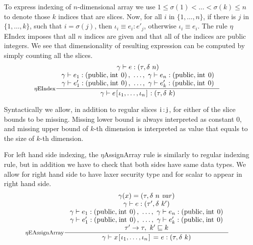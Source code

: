 \documentclass[a4paper, 10pt, draft]{report}
\newcommand{\mycode}[1]{\ensuremath{\mbox{\lstinline{#1}}}}
\begin{document}
To express indexing of $n$-dimensional array we use $1 \leq \sigma(1) < \ldots
< \sigma(k) \leq n$ to denote those $k$ indices that are slices. Now, for all
$i$ in $\{1, \ldots, n\}$, if there is $j$ in $\{1,\ldots,k\}$, such that $i =
\sigma(j)$, then $\iota_i \equiv e_i : e'_j$, otherwise $\iota_i \equiv e_i$.
The rule $\eta$EIndex imposes that all $n$ indices are given and that all of
the indices are public integers. We see that dimensionality of resulting
expression can be computed by simply counting all the slices.
\[
\inference[$\eta$EIndex]
{
  \gamma |- e : \left( \tau, \delta\ n \right) \\
  \gamma |- e_1 : \left(\mycode{public}, \mycode{int}\ 0 \right),\ \ldots,\ \gamma |- e_n : \left(\mycode{public}, \mycode{int}\ 0 \right)\\
  \gamma |- e'_1 : \left(\mycode{public}, \mycode{int}\ 0 \right),\ \ldots,\ \gamma |- e'_k : \left(\mycode{public}, \mycode{int}\ 0 \right)
} 
{
  \gamma |- e \mycode{[} \iota_1, \ldots, \iota_n \mycode{]} : \left(\tau, \delta\ k\right)
}
\]

Syntactically we allow, in addition to regular slices \mycode{i:j}, for either
of the slice bounds to be missing. Missing lower bound is always interpreted as
constant $0$, and missing upper bound of $k$-th dimension is interpreted as
value that equals to the size of $k$-th dimension.

For left hand side indexing, the $\eta$AssignArray rule is similarly to regular
indexing rule, but in addition we have to check that both sides have same data
types. We allow for right hand side to have laxer security type and for scalar
to appear in right hand side.
\[ \inference[$\eta$EAssignArray]
{
  \gamma(x) = \left( \tau, \delta\ n\ \mathit{var} \right) \\
  \gamma |- e : \left(\tau', \delta\ k'\right) \\
  \gamma |- e_1 : \left(\mycode{public}, \mycode{int}\ 0 \right),\ \ldots,\ \gamma |- e_n : \left(\mycode{public}, \mycode{int}\ 0 \right)\\
  \gamma |- e'_1 : \left(\mycode{public}, \mycode{int}\ 0 \right),\ \ldots,\ \gamma |- e'_k : \left(\mycode{public}, \mycode{int}\ 0 \right)\\
  \tau' \to \tau,\ k' \sqsubseteq k
} 
{
  \gamma |- x \mycode{[} \iota_1, \ldots, \iota_n \mycode{]}\ \mycode{=}\ e : \left(\tau, \delta\ k\right)
} \]
\end{document}
